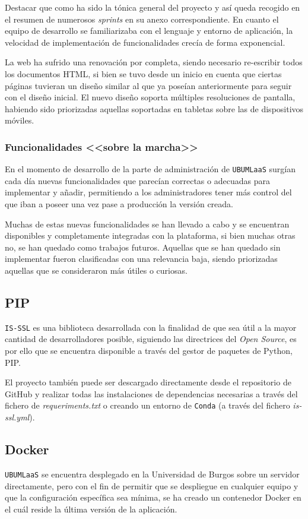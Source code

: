 Destacar que como ha sido la tónica general del proyecto y así queda recogido en el resumen de numerosos \textit{sprints} en su anexo correspondiente. En cuanto el equipo de desarrollo se familiarizaba con el lenguaje y entorno de aplicación, la velocidad de implementación de funcionalidades crecía de forma exponencial.

La web ha sufrido una renovación por completa, siendo necesario re-escribir todos los documentos HTML, si bien se tuvo desde un inicio en cuenta que ciertas páginas tuvieran un diseño similar al que ya poseían anteriormente para seguir con el diseño inicial. El nuevo diseño soporta múltiples resoluciones de pantalla, habiendo sido priorizadas aquellas soportadas en tabletas sobre las de dispositivos móviles.

\subsubsection{Funcionalidades <<sobre la marcha>>}
En el momento de desarrollo de la parte de administración de \texttt{UBUMLaaS} surgían cada día nuevas funcionalidades que parecían correctas o adecuadas para implementar y añadir, permitiendo a los administradores tener más control del que iban a poseer una vez pase a producción la versión creada.

Muchas de estas nuevas funcionalidades se han llevado a cabo y se encuentran disponibles y completamente integradas con la plataforma, si bien muchas otras no, se han quedado como trabajos futuros. Aquellas que se han quedado sin implementar fueron clasificadas con una relevancia baja, siendo priorizadas aquellas que se consideraron más útiles o curiosas.

\subsection{PIP}
\texttt{IS-SSL} es una biblioteca desarrollada con la finalidad de que sea útil a la mayor cantidad de desarrolladores posible, siguiendo las directrices del \textit{Open Source}, es por ello que se encuentra disponible a través del gestor de paquetes de Python, PIP. 

El proyecto también puede ser descargado directamente desde el repositorio de GitHub y realizar todas las instalaciones de dependencias necesarias a través del fichero de \textit{requeriments.txt} o creando un entorno de \texttt{Conda} (a través del fichero \textit{is-ssl.yml}).

\subsection{Docker}
\texttt{UBUMLaaS} se encuentra desplegado en la Universidad de Burgos sobre un servidor directamente, pero con el fin de permitir que se despliegue en cualquier equipo y que la configuración específica sea mínima, se ha creado un contenedor Docker en el cuál reside la última versión de la aplicación. 

